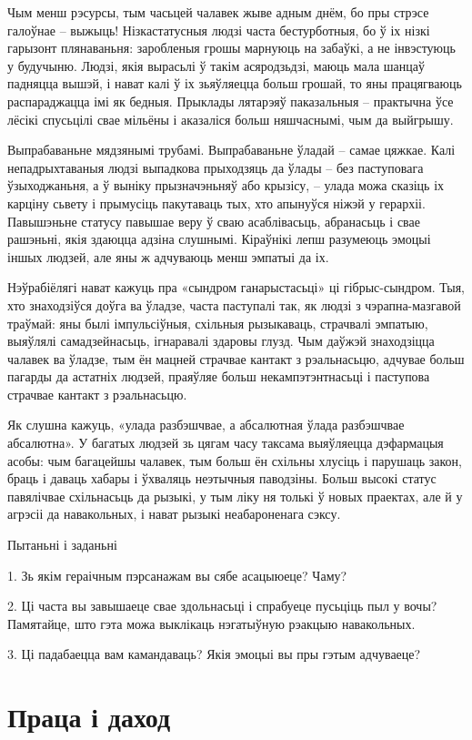 Чым менш рэсурсы, тым часьцей чалавек жыве адным днём, бо пры стрэсе галоўнае – выжыць! Нізкастатусныя людзі часта бестурботныя, бо ў іх нізкі гарызонт плянаваньня: заробленыя грошы марнуюць на забаўкі, а не інвэстуюць у будучыню. Людзі, якія вырасьлі ў такім асяродзьдзі, маюць мала шанцаў падняцца вышэй, і нават калі ў іх зьяўляецца больш грошай, то яны працягваюць распараджацца імі як бедныя. Прыклады лятарэяў паказальныя – практычна ўсе лёсікі спусьцілі свае мільёны і аказаліся больш няшчаснымі, чым да выйгрышу.

Выпрабаваньне мядзянымі трубамі. Выпрабаваньне ўладай – самае цяжкае. Калі непадрыхтаваныя людзі выпадкова прыходзяць да ўлады – без паступовага ўзыходжаньня, а ў выніку прызначэньняў або крызісу, – улада можа сказіць іх карціну сьвету і прымусіць пакутаваць тых, хто апынуўся ніжэй у герархіі. Павышэньне статусу павышае веру ў сваю асаблівасьць, абранасьць і свае рашэньні, якія здаюцца адзіна слушнымі. Кіраўнікі лепш разумеюць эмоцыі іншых людзей, але яны ж адчуваюць менш эмпатыі да іх.

Нэўрабіёлягі нават кажуць пра «сындром ганарыстасьці» ці гібрыс-сындром. Тыя, хто знаходзіўся доўга ва ўладзе, часта паступалі так, як людзі з чэрапна-мазгавой траўмай: яны былі імпульсіўныя, схільныя рызыкаваць, страчвалі эмпатыю, выяўлялі самадзейнасьць, ігнаравалі здаровы глузд. Чым даўжэй знаходзіцца чалавек ва ўладзе, тым ён мацней страчвае кантакт з рэальнасьцю, адчувае больш пагарды да астатніх людзей, праяўляе больш некампэтэнтнасьці і паступова страчвае кантакт з рэальнасьцю.

Як слушна кажуць, «улада разбэшчвае, а абсалютная ўлада разбэшчвае абсалютна». У багатых людзей зь цягам часу таксама выяўляецца дэфармацыя асобы: чым багацейшы чалавек, тым больш ён схільны хлусіць і парушаць закон, браць і даваць хабары і ўхваляць неэтычныя паводзіны. Больш высокі статус павялічвае схільнасьць да рызыкі, у тым ліку ня толькі ў новых праектах, але й у агрэсіі да навакольных, і нават рызыкі неабароненага сэксу.

Пытаньні і заданьні

1. Зь якім гераічным пэрсанажам вы сябе асацыюеце? Чаму?

2. Ці часта вы завышаеце свае здольнасьці і спрабуеце пусьціць пыл у вочы? Памятайце, што гэта можа выклікаць нэгатыўную рэакцыю навакольных.

3. Ці падабаецца вам камандаваць? Якія эмоцыі вы пры гэтым адчуваеце?


\section{Праца і даход}

